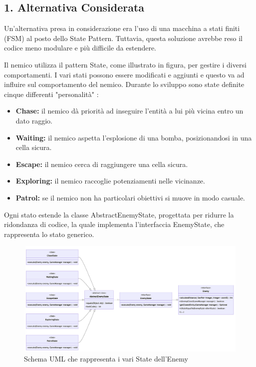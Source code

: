 \documentclass[a4paper,12pt]{report}
\begin{document}
\subsection*{1. Alternativa Considerata}
\par
Un'alternativa presa in considerazione era l'uso di una macchina a stati finiti (FSM) al posto dello State Pattern. Tuttavia, questa soluzione avrebbe reso il codice meno modulare e più difficile da estendere.

\par
Il nemico utilizza il pattern State, come illustrato in figura, per gestire i diversi comportamenti. I vari stati possono essere modificati e aggiunti e questo va ad influire sul comportamento del nemico. Durante lo sviluppo sono state definite cinque differenti "personalità" :
\begin{itemize}
 \item \textbf{Chase:} il nemico dà priorità ad inseguire l’entità a lui più vicina entro un dato raggio.
 \item \textbf{Waiting:} il nemico aspetta l’esplosione di una bomba, posizionandosi in una cella sicura.
 \item \textbf{Escape:}  il nemico cerca di raggiungere una cella sicura.
 \item \textbf{Exploring:}  il nemico raccoglie potenziamenti nelle vicinanze.
 \item \textbf{Patrol:} se il nemico non ha particolari obiettivi si muove in modo casuale.
\end{itemize}

\par
Ogni stato estende la classe AbstractEnemyState, progettata per ridurre la ridondanza di codice, la quale implementa l’interfaccia EnemyState, che rappresenta lo stato generico.

\begin{figure}[h]
\centering{}
\includegraphics[width=\textwidth]{report-src/img/enemyState.png}
\caption{Schema UML che rappresenta i vari State dell'Enemy}
\end{figure}
\end{document}
